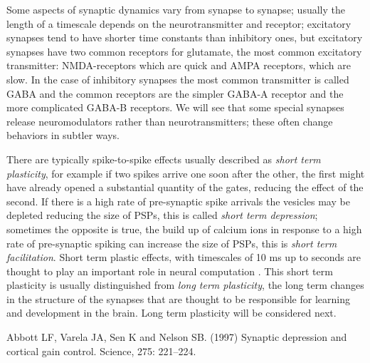 \documentclass{article}
\begin{document}
Some aspects of synaptic dynamics vary from synapse to synapse;
usually the length of a timescale depends on the neurotransmitter and
receptor; excitatory synapses tend to have shorter time constants than
inhibitory ones, but excitatory synapses have two common receptors for
glutamate, the most common excitatory transmitter: NMDA-receptors
which are quick and AMPA receptors, which are slow. In the case of
inhibitory synapses the most common transmitter is called GABA and the
common receptors are the simpler GABA-A receptor and the more
complicated GABA-B receptors. We will see that some special synapses
release neuromodulators rather than neurotransmitters; these often
change behaviors in subtler ways.

There are typically spike-to-spike effects usually described as
\textsl{short term plasticity}, for example if two spikes arrive one
soon after the other, the first might have already opened a
substantial quantity of the gates, reducing the effect of the second.
If there is a high rate of pre-synaptic spike arrivals the vesicles
may be depleted reducing the size of PSPs, this is called
\textsl{short term depression}; sometimes the opposite is true, the
build up of calcium ions in response to a high rate of pre-synaptic
spiking can increase the size of PSPs, this is \textsl{short term
  facilitation}. Short term plastic effects, with timescales of 10 ms
up to seconds are thought to play an important role in neural
computation \cite{AbbottEtAl1997a}. This short term plasticity is
usually distinguished from \textsl{long term plasticity}, the long term changes
in the structure of the synapses that are thought to be responsible
for learning and development in the brain. Long term plasticity will be considered next.

\begin{thebibliography}{10}

Abbott LF, Varela JA, Sen K and Nelson SB. (1997) Synaptic depression and cortical gain control. 
\newblock Science, 275: 221--224.

\end{thebibliography}
\end{document}
